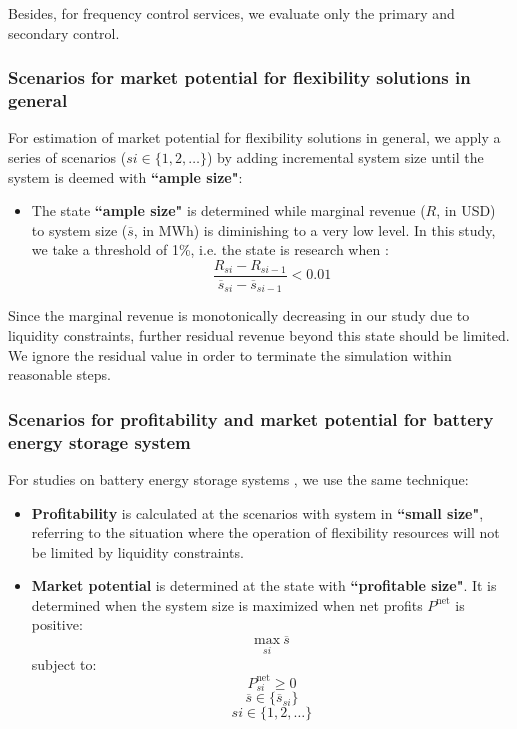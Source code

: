 Besides, for frequency control services, we evaluate only the primary and secondary control.

\subsubsection{Scenarios for market potential for flexibility solutions in general}

For estimation of market potential for flexibility solutions in general, we apply a series of scenarios ($si \in \{1,2,\dots\}$) by adding incremental system size until the system is deemed with \textbf{``ample size"}:
\begin{itemize}
	\item The state \textbf{``ample size"} is determined while marginal revenue ($R$, in USD) to system size ($\overline{s}$, in MWh) is diminishing to a very low level. In this study, we take a threshold of 1\%, i.e. the state is research when :
	\begin{equation*}
	\frac{R_{si}-R_{si-1}}{\overline{s}_{si}-\overline{s}_{si-1}} < 0.01
	\end{equation*}
\end{itemize}
Since the marginal revenue is monotonically decreasing in our study due to liquidity constraints, further residual revenue beyond this state should be limited. We ignore the residual value in order to terminate the simulation within reasonable steps.

\subsubsection{Scenarios for profitability and market potential for battery energy storage system}
For studies on battery energy storage systems , we use the same technique:

\begin{itemize}
	\item \textbf{Profitability} is calculated at the scenarios with system in \textbf{``small size"}, referring to the situation where the operation of flexibility resources will not be limited by liquidity constraints.
	\item \textbf{Market potential} is determined at the state with \textbf{``profitable size"}. It is determined when the system size is maximized when net profits $P^{\text{net}}$ is positive:
	\begin{equation*}
	\underset{si}{\text{max}}~\overline{s}
	\end{equation*}
	subject to:
	\begin{equation*}
		P^{\text{net}}_{si} \geq 0
	\end{equation*}
	\begin{equation*}
		\overline{s} \in  \{ \overline{s}_{si}\}
	\end{equation*}
	\begin{equation*}
	si \in \{1,2,\dots\}
	\end{equation*}
\end{itemize}






